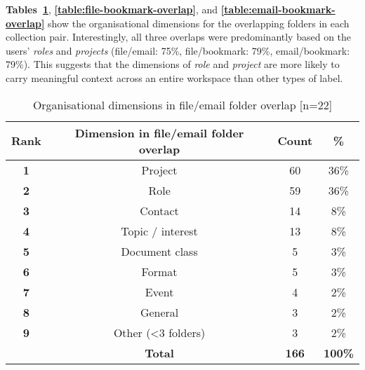 \textbf{Tables~\ref{table:file-email-overlap}}, \textbf{\ref{table:file-bookmark-overlap}}, and \textbf{\ref{table:email-bookmark-overlap}} show the organisational dimensions for the overlapping folders in each collection pair.  Interestingly, all three overlaps were predominantly based on the users' \textit{roles} and \textit{projects} (file/email: 75\%, file/bookmark: 79\%, email/bookmark: 79\%). This suggests that the dimensions of \textit{role} and \textit{project} are more likely to carry meaningful context across an entire workspace than other types of label. %

\begin{table}[hbt]
\begin{center}
\begin{footnotesize}
\setlength{\extrarowheight}{2pt}
\begin{tabular}{|c|c|c|c|}
\hline
{\bf Rank} & {\bf Dimension in file/email folder overlap} & {\bf Count} &   {\bf \%} \\
\hline
   {\bf 1} &    Project &         60 &       36\% \\
\hline
   {\bf 2} &       Role &         59 &       36\% \\
\hline
   {\bf 3} &    Contact &         14 &        8\% \\
\hline
   {\bf 4} & Topic / interest &         13 &        8\% \\
\hline
   {\bf 5} & Document class &          5 &        3\% \\
\hline
   {\bf 6} &     Format &          5 &        3\% \\
\hline
   {\bf 7} &      Event &          4 &        2\% \\
\hline
   {\bf 8} &    General &          3 &        2\% \\
\hline
   {\bf 9} & Other (<3 folders) &          3 &        2\% \\
\hline
           & {\bf Total} &  {\bf 166} & {\bf 100\%} \\
\hline
\end{tabular}  
\end{footnotesize}
\caption{Organisational dimensions in file/email folder overlap [n=22]}
\label{table:file-email-overlap}
\end{center}
\end{table}

